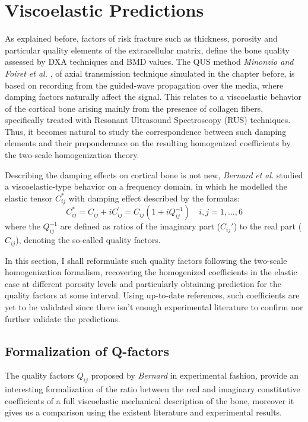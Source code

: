 \chapter{Viscoelastic Predictions}
As explained before, factors of risk fracture such as thickness, porosity and particular quality elements of the extracellular matrix, define the bone quality assessed by DXA techniques and BMD values. The QUS method \textit{Minonzio and Foiret et al.} \cite{Foiret2014}, \cite{Minonzio2018} of axial transmission technique simulated in the chapter before, is based on recording from the guided-wave propagation over the media, where damping factors naturally affect the signal. This relates to a viscoelastic behavior of the cortical bone arising mainly from the presence of collagen fibers, specifically treated with Resonant Ultrasound Spectroscopy (RUS) techniques. Thus, it becomes natural to study the correspondence between such damping elements and their preponderance on the resulting homogenized coefficients by the two-scale homogenization theory.

Describing the damping effects on cortical bone is not new, \textit{Bernard} \textit{et al. }\cite{Bernard2015} studied a viscoelastic-type behavior on a frequency domain, in which he modelled the elastic tensor $C^*_{ij}$ with damping effect described by the formulas:
\begin{equation*}
C^*_{ij} = C_{ij} + i C_{ij}^{'} = C_{ij} (1+ iQ_{ij}^{-1}) \quad i,j = 1,\dots, 6
\end{equation*}
where the $Q^{-1}_{ij}$ are defined as ratios of the imaginary part ($C_{ij}'$) to the real part ($C_{ij}$), denoting the so-called quality factors.

In this section, I shall reformulate such quality factors following the two-scale homogenization formalism, recovering the homogenized coefficients in the elastic case at different porosity levels and particularly obtaining prediction for the quality factors at some interval. Using up-to-date references, such coefficients are yet to be validated since there isn't enough experimental literature to confirm nor further validate the predictions.

\section{Formalization of Q-factors}
The quality factors $Q_{ij}$ proposed by \textit{Bernard} in experimental fashion, provide an interesting formalization of the ratio between the real and imaginary constitutive coefficients of a full viscoelastic mechanical description of the bone, moreover it gives us a comparison using the existent literature and experimental results.

